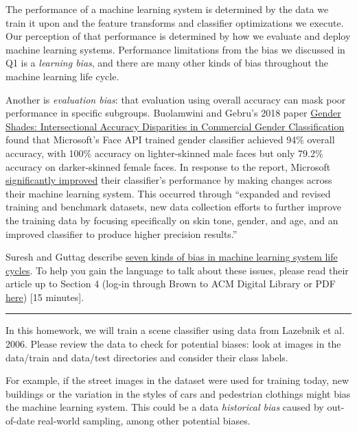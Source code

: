 \documentclass{csci1430}
\begin{document}
\pagebreak
\begin{question}[points=14,drawbox=false]
The performance of a machine learning system is determined by the data we train it upon and the feature transforms and classifier optimizations we execute. Our perception of that performance is determined by how we evaluate and deploy machine learning systems. Performance limitations from the bias we discussed in Q1 is a \emph{learning bias}, and there are many other kinds of bias throughout the machine learning life cycle.

Another is \emph{evaluation bias}: that evaluation using overall accuracy can mask poor performance in specific subgroups.
Buolamwini and Gebru's 2018 paper \href{http://proceedings.mlr.press/v81/buolamwini18a/buolamwini18a.pdf}{Gender Shades: Intersectional Accuracy Disparities in Commercial Gender Classification} found that Microsoft's Face API trained gender classifier achieved 94\% overall accuracy, with 100\% accuracy on lighter-skinned male faces but only 79.2\% accuracy on darker-skinned female faces. In response to the report, Microsoft \href{https://blogs.microsoft.com/ai/gender-skin-tone-facial-recognition-improvement/}{significantly improved} their classifier's performance by making changes across their machine learning system. This occurred through ``expanded and revised training and benchmark datasets, new data collection efforts to further improve the training data by focusing specifically on skin tone, gender, and age, and an improved classifier to produce higher precision results.''

Suresh and Guttag describe \href{https://dl.acm.org/doi/10.1145/3465416.3483305}{seven kinds of bias in machine learning system life cycles}. To help you gain the language to talk about these issues, please read their article up to Section 4 (log-in through Brown to ACM Digital Library or PDF \href{https://drive.google.com/file/d/10YdCwZ0E0XBYS3oj_hfeI0TQ6lpepGKK/view}{here}) [15 minutes].

\vspace{3ex}
\hrule
\vspace{1ex}

In this homework, we will train a scene classifier using data from Lazebnik et al. 2006. Please review the data to check for potential biases: look at images in the data/train and data/test directories and consider their class labels. 

For example, if the street images in the dataset were used for training today, new buildings or the variation in the styles of cars and pedestrian clothings might bias the machine learning system. This could be a data \emph{historical bias} caused by out-of-date real-world sampling, among other potential biases. 
\end{question}
\end{document}

